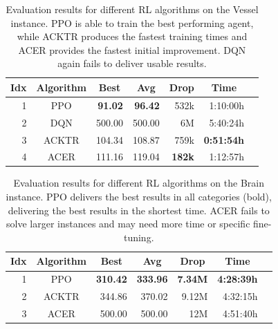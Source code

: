 \begin{table}[htp]
    \begin{center}
        \begin{tabular}{rcrrrrr}
            \toprule
            \multicolumn{1}{c}{Idx} & \multicolumn{1}{c}{Algorithm} & \multicolumn{1}{c}{Best} & \multicolumn{1}{c}{Avg} & \multicolumn{1}{c}{Drop} & \multicolumn{1}{c}{Time}\\
            \midrule
            1 & PPO & \textbf{91.02} & \textbf{96.42} & 532k & 1:10:00h \\
            2 & DQN & 500.00 & 500.00 & 6M & 5:40:24h \\
            3 & ACKTR & 104.34 & 108.87 & 759k & \textbf{0:51:54h} \\
            4 & ACER & 111.16 & 119.04 & \textbf{182k} & 1:12:57h \\
            \bottomrule
        \end{tabular}
    \end{center}
    \caption[Evaluation of RL Algorithms on the Vessel Instance]{Evaluation results for different RL algorithms on the Vessel instance. PPO is able to train the best performing agent, while ACKTR produces the fastest training times and ACER provides the fastest initial improvement. DQN again fails to deliver usable results.} \label{tab:AlgorithmEval/VesselMaze02}
\end{table}

\begin{table}[htp]
    \begin{center}
        \begin{tabular}{rcrrrrr}
            \toprule
            \multicolumn{1}{c}{Idx} & \multicolumn{1}{c}{Algorithm} & \multicolumn{1}{c}{Best} & \multicolumn{1}{c}{Avg} & \multicolumn{1}{c}{Drop} &  \multicolumn{1}{c}{Time}\\
            \midrule
            1 & PPO & \textbf{310.42} & \textbf{333.96} & \textbf{7.34M} & \textbf{4:28:39h} \\
            2 & ACKTR & 344.86 & 370.02 & 9.12M & 4:32:15h \\
            3 & ACER & 500.00 & 500.00 & 12M & 4:51:40h \\
            \bottomrule
        \end{tabular}
    \end{center}
    \caption[Evaluation of RL Algorithms on the Brain Instance]{Evaluation results for different RL algorithms on the Brain instance. PPO delivers the best results in all categories (bold), delivering the best results in the shortest time. ACER fails to solve larger instances and may need more time or specific fine-tuning.} \label{tab:AlgorithmEval/Maze0122}
\end{table}

